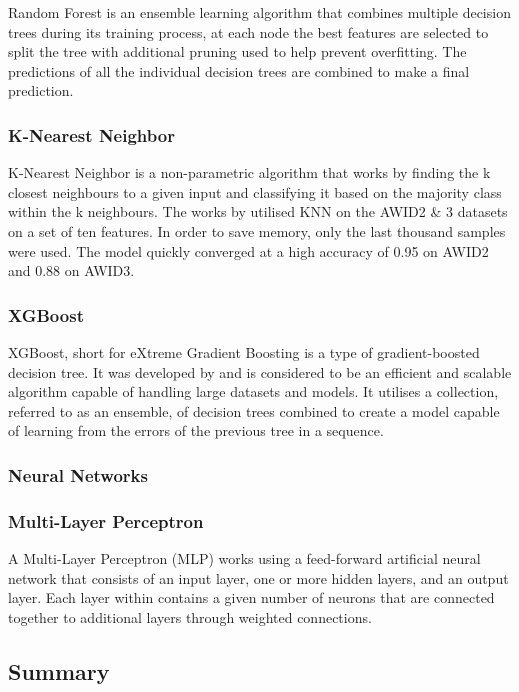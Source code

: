 Random Forest is an ensemble learning algorithm that combines multiple decision trees during its training process, at each node the best features are selected to split the tree with additional pruning used to help prevent overfitting. The predictions of all the individual decision trees are combined to make a final prediction.

\subsubsection{K-Nearest Neighbor}

K-Nearest Neighbor is a non-parametric algorithm that works by finding the k closest neighbours to a given input and classifying it based on the majority class within the k neighbours. 
	The works by \textcite{10150/666297} utilised KNN on the AWID2 \& 3 datasets on a set of ten features. In order to save memory, only the last thousand samples were used. The model quickly converged at a high accuracy of 0.95 on AWID2 and 0.88 on AWID3. 

\subsubsection{XGBoost}

XGBoost, short for eXtreme Gradient Boosting is a type of gradient-boosted decision tree. It was developed by \textcite{XGBoost} and is considered to be an efficient and scalable algorithm capable of handling large datasets and models. It utilises a collection, referred to as an ensemble, of decision trees combined to create a model capable of learning from the errors of the previous tree in a sequence. 

\subsubsection{Neural Networks}

\subsubsection*{Multi-Layer Perceptron}

A Multi-Layer Perceptron (MLP) works using a feed-forward artificial neural network that consists of an input layer, one or more hidden layers, and an output layer. Each layer within contains a given number of neurons that are connected together to additional layers through weighted connections. 


\subsection{Summary}

